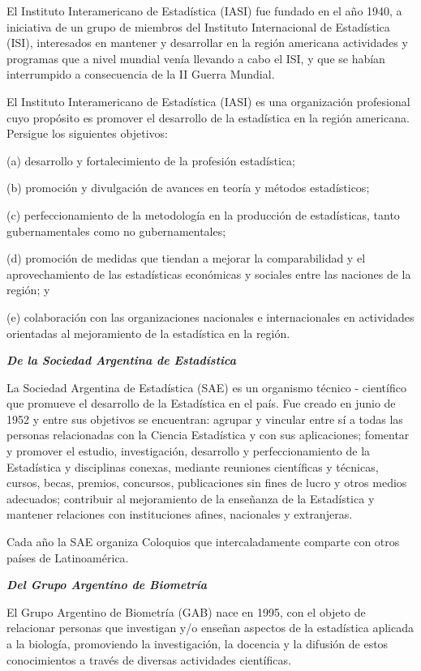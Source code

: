 \documentclass[12pt,a4paper]{article}
\begin{document}
El Instituto Interamericano de Estadística (IASI) fue fundado en el año 1940, a iniciativa de un grupo de miembros del Instituto Internacional de Estadística (ISI), interesados en mantener y desarrollar en la región americana actividades y programas que a nivel mundial venía llevando a cabo el ISI, y que se habían interrumpido a consecuencia de la II Guerra Mundial.

El Instituto Interamericano de Estadística (IASI) es una organización profesional cuyo propósito es promover el desarrollo de la estadística en la región americana.  Persigue los siguientes objetivos: 

(a) desarrollo y fortalecimiento de la profesión estadística;

(b) promoción y divulgación de avances en teoría y métodos estadísticos;

(c) perfeccionamiento de la metodología en la producción de estadísticas, tanto gubernamentales como no gubernamentales;

(d) promoción de medidas que tiendan a mejorar la comparabilidad y el aprovechamiento de las estadísticas económicas y sociales entre las naciones de la región; y

(e) colaboración con las organizaciones nacionales e internacionales en actividades orientadas al mejoramiento de la estadística en la región.

\bigskip

\bigbreak
\noindent\textbf{\textit{De la Sociedad Argentina de Estadística}}

La Sociedad Argentina de Estadística (SAE) es un organismo técnico - científico que promueve el desarrollo de la Estadística en el país. Fue creado en junio de 1952 y entre sus objetivos se encuentran: agrupar y vincular entre sí a todas las personas relacionadas con la Ciencia Estadística y con sus aplicaciones; fomentar y promover el estudio, investigación, desarrollo y perfeccionamiento de la Estadística y disciplinas conexas, mediante reuniones científicas y técnicas, cursos, becas, premios, concursos, publicaciones sin fines de lucro y otros medios adecuados; contribuir al mejoramiento de la enseñanza de la Estadística y mantener relaciones con instituciones afines, nacionales y extranjeras.

Cada año la SAE organiza Coloquios que intercaladamente comparte con otros países de Latinoamérica.

\bigbreak
\noindent\textbf{\textit{Del Grupo Argentino de Biometría}}

El Grupo Argentino de Biometría (GAB) nace en 1995, con el objeto de relacionar personas que investigan y/o enseñan aspectos de la estadística aplicada a la biología, promoviendo la investigación, la docencia y la difusión de estos conocimientos a través de diversas actividades científicas.
\end{document}
